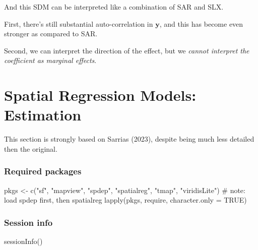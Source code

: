 \documentclass[
  letterpaper,
]{scrbook}
\newenvironment{Shaded}{\begin{snugshade}}{\end{snugshade}}
\newcommand{\AttributeTok}[1]{\textcolor[rgb]{0.40,0.45,0.13}{#1}}
\newcommand{\CommentTok}[1]{\textcolor[rgb]{0.37,0.37,0.37}{#1}}
\newcommand{\ConstantTok}[1]{\textcolor[rgb]{0.56,0.35,0.01}{#1}}
\newcommand{\FunctionTok}[1]{\textcolor[rgb]{0.28,0.35,0.67}{#1}}
\newcommand{\NormalTok}[1]{\textcolor[rgb]{0.00,0.23,0.31}{#1}}
\newcommand{\OtherTok}[1]{\textcolor[rgb]{0.00,0.23,0.31}{#1}}
\newcommand{\StringTok}[1]{\textcolor[rgb]{0.13,0.47,0.30}{#1}}
\begin{document}
And this SDM can be interpreted like a combination of SAR and SLX.

First, there's still substantial auto-correlation in
\(\boldsymbol{\mathbf{y}}\), and this has become even stronger as
compared to SAR.

Second, we can interpret the direction of the effect, but we
\emph{cannot interpret the coefficient as marginal effects}.


\hypertarget{spatial-regression-models-estimation}{%
\chapter{Spatial Regression Models:
Estimation}\label{spatial-regression-models-estimation}}

This section is strongly based on Sarrias (2023), despite being much
less detailed then the original.

\hypertarget{required-packages-6}{%
\subsection*{Required packages}\label{required-packages-6}}

\begin{Shaded}
\begin{Highlighting}[]
\NormalTok{pkgs }\OtherTok{\textless{}{-}} \FunctionTok{c}\NormalTok{(}\StringTok{"sf"}\NormalTok{, }\StringTok{"mapview"}\NormalTok{, }\StringTok{"spdep"}\NormalTok{, }\StringTok{"spatialreg"}\NormalTok{, }\StringTok{"tmap"}\NormalTok{, }\StringTok{"viridisLite"}\NormalTok{) }\CommentTok{\# note: load spdep first, then spatialreg}
\FunctionTok{lapply}\NormalTok{(pkgs, require, }\AttributeTok{character.only =} \ConstantTok{TRUE}\NormalTok{)}
\end{Highlighting}
\end{Shaded}

\hypertarget{session-info-6}{%
\subsection*{Session info}\label{session-info-6}}

\begin{Shaded}
\begin{Highlighting}[]
\FunctionTok{sessionInfo}\NormalTok{()}
\end{Highlighting}
\end{Shaded}
\end{document}
